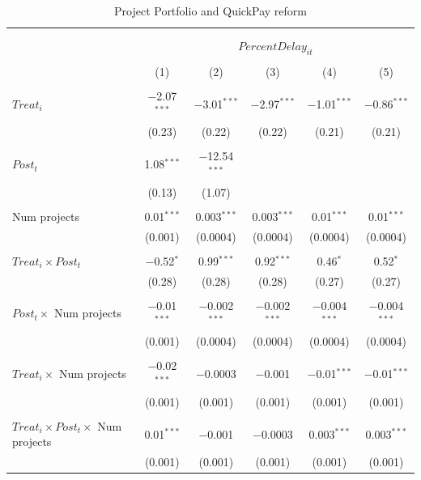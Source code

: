 \documentclass[
]{article}
\begin{document}
\begin{table}[H] \centering 
  \caption{Project Portfolio and QuickPay reform} 
  \label{} 
\small 
\begin{tabular}{@{\extracolsep{-2pt}}lccccc} 
\\[-1.8ex]\hline 
\hline \\[-1.8ex] 
\\[-1.8ex] & \multicolumn{5}{c}{$PercentDelay_{it}$  } \\ 
\\[-1.8ex] & (1) & (2) & (3) & (4) & (5)\\ 
\hline \\[-1.8ex] 
 $Treat_i$ & $-$2.07$^{***}$ & $-$3.01$^{***}$ & $-$2.97$^{***}$ & $-$1.01$^{***}$ & $-$0.86$^{***}$ \\ 
  & (0.23) & (0.22) & (0.22) & (0.21) & (0.21) \\ 
  & & & & & \\ 
 $Post_t$ & 1.08$^{***}$ & $-$12.54$^{***}$ &  &  &  \\ 
  & (0.13) & (1.07) &  &  &  \\ 
  & & & & & \\ 
 Num projects & 0.01$^{***}$ & 0.003$^{***}$ & 0.003$^{***}$ & 0.01$^{***}$ & 0.01$^{***}$ \\ 
  & (0.001) & (0.0004) & (0.0004) & (0.0004) & (0.0004) \\ 
  & & & & & \\ 
 $Treat_i \times Post_t$ & $-$0.52$^{*}$ & 0.99$^{***}$ & 0.92$^{***}$ & 0.46$^{*}$ & 0.52$^{*}$ \\ 
  & (0.28) & (0.28) & (0.28) & (0.27) & (0.27) \\ 
  & & & & & \\ 
 $Post_t \times$ Num projects & $-$0.01$^{***}$ & $-$0.002$^{***}$ & $-$0.002$^{***}$ & $-$0.004$^{***}$ & $-$0.004$^{***}$ \\ 
  & (0.001) & (0.0004) & (0.0004) & (0.0004) & (0.0004) \\ 
  & & & & & \\ 
 $Treat_i \times$ Num projects & $-$0.02$^{***}$ & $-$0.0003 & $-$0.001 & $-$0.01$^{***}$ & $-$0.01$^{***}$ \\ 
  & (0.001) & (0.001) & (0.001) & (0.001) & (0.001) \\ 
  & & & & & \\ 
 $Treat_i \times Post_t \times$ Num projects & 0.01$^{***}$ & $-$0.001 & $-$0.0003 & 0.003$^{***}$ & 0.003$^{***}$ \\ 
  & (0.001) & (0.001) & (0.001) & (0.001) & (0.001) \\ 

\end{tabular}
\end{table}
\end{document}
